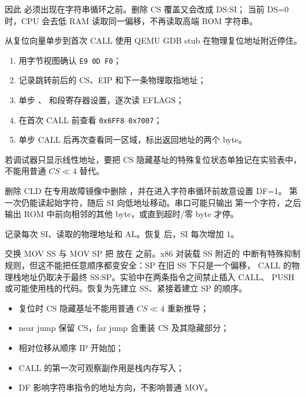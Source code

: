 因此  必须出现在字符串循环之前。删除 CS 覆盖又会改成 DS:SI；
当前 DS=0 时，CPU 会去低 RAM 读取同一偏移，不再读取高端 ROM 字符串。

\begin{experimentbox}{从复位向量单步到首次 CALL}
使用 QEMU GDB stub 在物理复位地址附近停住。

\begin{enumerate}[leftmargin=2.2em]
  \item 用字节视图确认 \texttt{E9 0D F0}；
  \item 记录跳转前后的 CS、EIP 和下一条物理取指地址；
  \item 单步 、 和段寄存器设置，逐次读 EFLAGS；
  \item 在首次 CALL 前查看 \texttt{0x6FF8}--\texttt{0x7007}；
  \item 单步 CALL 后再次查看同一区域，标出返回地址的两个 byte。
\end{enumerate}

若调试器只显示线性地址，要把 CS 隐藏基址的特殊复位状态单独记在实验表中，
不能用普通 \(CS\ll4\) 替代。
\end{experimentbox}

\begin{faultinjectionbox}{删除 CLD}
在专用故障镜像中删除 ，并在进入字符串循环前故意设置 DF=1。
 第一次仍能读起始字符，随后 SI 向低地址移动。串口可能只输出
第一个字符，之后输出 ROM 中前向相邻的其他 byte，或直到超时/零 byte 才停。

记录每次 SI、读取的物理地址和 AL。恢复  后，SI 每次增加 1。
\end{faultinjectionbox}

\begin{faultinjectionbox}{交换 MOV SS 与 MOV SP}
把  放在  之前。x86 对装载 SS 附近的
中断有特殊抑制规则，但这不能把任意顺序都变安全：SP 在旧 SS 下只是一个偏移，
CALL 的物理栈地址仍取决于最终 SS:SP。实验中在两条指令之间禁止插入 CALL、
PUSH 或可能使用栈的代码。恢复为先建立 SS、紧接着建立 SP 的顺序。
\end{faultinjectionbox}

\begin{pitfallbox}
\begin{itemize}[leftmargin=2.2em]
  \item 复位时 CS 隐藏基址不能用普通 \(CS\ll4\) 重新推导；
  \item near jump 保留 CS，far jump 会重装 CS 及其隐藏部分；
  \item 相对位移从顺序 IP 开始加；
  \item CALL 的第一次可观察副作用是栈内存写入；
  \item DF 影响字符串指令的地址方向，不影响普通 MOV。
\end{itemize}
\end{pitfallbox}

